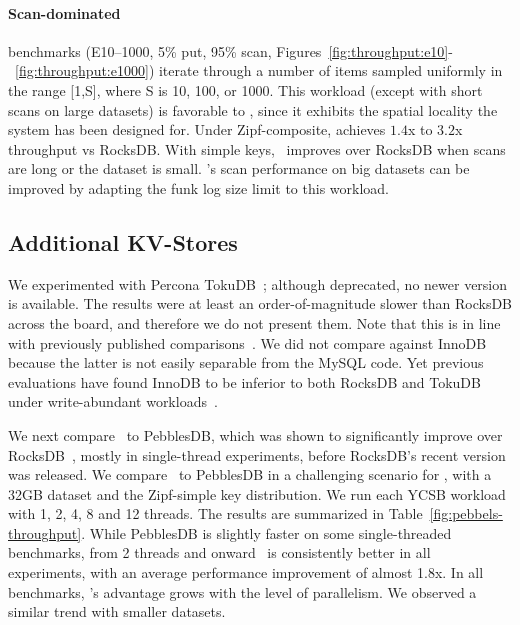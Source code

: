 \paragraph{ Scan-dominated} benchmarks (E10--1000,  5\% put, 95\% scan, Figures~\ref{fig:throughput:e10}-~\ref{fig:throughput:e1000})
iterate through a number of items 
sampled uniformly in the range [1,S], where S is  10, 100, or 1000. 
This workload (except with short scans on  large datasets) is favorable to \sys, 
since it exhibits the spatial locality the system has been designed for. 
Under Zipf-composite, \sys\/ achieves $1.4$x to $3.2$x throughput vs RocksDB.   
With simple keys, \sys\ improves over RocksDB when scans are long or the dataset is small. 
\sys's scan performance on big datasets can be improved by adapting the funk log size limit to this workload. 

\subsection{Additional KV-Stores}
\label{ssec:pebbles} 


We experimented with Percona TokuDB~\cite{TokuDBgit}; although deprecated, no newer version is available. 
The results were at least an order-of-magnitude slower than RocksDB across the board, and therefore we do not present them. 
Note that this is in line with previously published comparisons~\cite{DBLP:conf/cidr/DongCGBSS17,tucana,toku-rocks-inno}.
We did not compare \sys\/  against
InnoDB because the latter is not easily separable 
from the MySQL code. Yet previous evaluations have found  InnoDB to be inferior to both RocksDB and TokuDB under 
write-abundant workloads~\cite{toku-rocks-inno}.

We next compare \sys\ to PebblesDB, which was shown to significantly improve over RocksDB~\cite{PebblesDB},
mostly in single-thread experiments, before RocksDB's recent version was released.  
We compare \sys\ to PebblesDB in a challenging  scenario for \sys, with a 32GB dataset and the Zipf-simple key 
distribution. We run each YCSB workload with 1, 2, 4, 8 and 12 threads. The results are summarized in Table~\ref{fig:pebbels-throughput}. 
While PebblesDB is slightly faster on some single-threaded benchmarks, from 2 threads and onward \sys\ is consistently better in all experiments, 
with an average performance improvement of almost 1.8x.  In all benchmarks, 
 \sys's advantage grows with the level of parallelism. We observed a similar trend with smaller datasets. 

